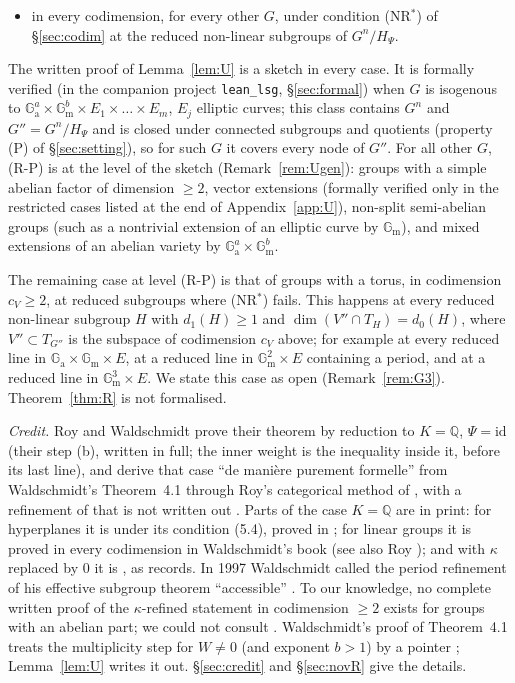 \documentclass[11pt]{amsart}
\theoremstyle{definition}
\newcommand{\Q}{\mathbb{Q}}
\newcommand{\Ga}{\mathbb{G}_{\mathrm a}}
\newcommand{\Gm}{\mathbb{G}_{\mathrm m}}
\begin{document}
\begin{itemize}
\begin{itemize}
by a vector group (such as $\Ga^{d_0}\times A$ or $A^\natural$);
\item[($\gamma$)] in every codimension, for every other $G$, under condition (NR$^*$) of \S\ref{sec:codim} at the reduced
non-linear subgroups of $G^n/H_\Psi$.
\end{itemize}
The written proof of Lemma~\ref{lem:U} is a sketch in every case. It is formally verified (in the companion project
\texttt{lean\_lsg}, \S\ref{sec:formal}) when $G$ is isogenous to $\Ga^{a}\times\Gm^{b}\times E_1\times\dots\times E_m$, $E_j$
elliptic curves; this class contains $G^n$ and $G''=G^n/H_\Psi$ and is closed under connected subgroups and quotients
(property (P) of \S\ref{sec:setting}), so for such $G$ it covers every node of $G''$. For all other $G$, (R-P) is at the
level of the sketch (Remark~\ref{rem:Ugen}): groups with a simple abelian factor of dimension $\ge2$, vector extensions
(formally verified only in the restricted cases listed at the end of Appendix~\ref{app:U}), non-split semi-abelian groups
(such as a nontrivial extension of an elliptic curve by $\Gm$), and mixed extensions of an abelian variety by
$\Ga^a\times\Gm^b$.
\end{itemize}
The remaining case at level (R-P) is that of groups with a torus, in codimension $c_V\ge2$, at reduced subgroups where
(NR$^*$) fails. This happens at every reduced non-linear subgroup $H$ with $d_1(H)\ge1$ and $\dim(V''\cap T_H)=d_0(H)$, where
$V''\subset T_{G''}$ is the subspace of codimension $c_V$ above; for example at every reduced line in $\Ga\times\Gm\times E$,
at a reduced line in $\Gm^2\times E$ containing a period, and at a reduced line in $\Gm^3\times E$. We state this case as
open (Remark~\ref{rem:G3}). Theorem~\ref{thm:R} is not formalised.

\medskip\noindent\emph{Credit.} Roy and Waldschmidt prove their theorem by reduction to $K=\Q$, $\Psi=\mathrm{id}$ (their
step (b), written in full; the inner weight is the inequality inside it, before its last line), and derive that case
``de mani\`ere purement formelle'' from Waldschmidt's Theorem~4.1 through Roy's categorical method of \cite{R1}, with a
refinement of \cite[\S6]{R1} that is not written out \cite[p.~363, Remarque 2]{RW93}. Parts of the case $K=\Q$ are in
print: for hyperplanes it is \cite[Thm.~1.1]{W88} under its condition (5.4), proved in \cite[\S5d]{W88}; for linear groups it
is proved in every codimension in Waldschmidt's book \cite[\S11.7.3]{W00} (see also Roy \cite{Roy92}); and with $\kappa$
replaced by $0$ it is \cite[\S6, remarque (i)]{R1}, as \cite[Remarque 2]{RW93} records. In 1997 Waldschmidt called the
period refinement of his effective subgroup theorem ``accessible'' \cite[\S7(f)]{W97}. To our knowledge, no complete
written proof of the $\kappa$-refined statement in codimension $\ge2$ exists for groups with an abelian part; we could not
consult \cite{R1}. Waldschmidt's proof of Theorem~4.1 treats the multiplicity step for $W\ne0$ (and exponent $b>1$) by a
pointer \cite[p.~396]{W88}; Lemma~\ref{lem:U} writes it out. \S\ref{sec:credit} and \S\ref{sec:novR} give the details.
\end{document}
